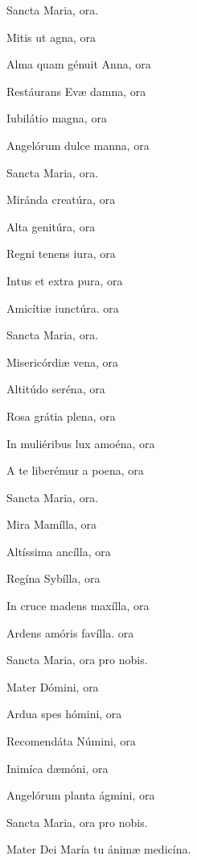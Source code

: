 \documentclass[12pt,a6paper]{book}
\begin{document}
\begin{sloppy}
Sancta Maria, ora.

\vspace{3mm}

Mitis ut agna, ora

Alma quam génuit Anna, ora

Restáurans Evæ damna, ora

Iubilátio magna, ora

Angelórum dulce manna, ora

Sancta Maria, ora.

\vspace{3mm}

Miránda creatúra, ora

Alta genitúra, ora

Regni tenens iura, ora

Intus et extra pura, ora

Amicítiæ iunctúra. ora

Sancta Maria, ora.

\vspace{3mm}

Misericórdiæ vena,  ora

Altitúdo seréna, ora

Rosa grátia plena, ora

In muliéribus lux amoéna, ora

A te liberémur a poena, ora

Sancta Maria, ora.

\vspace{3mm}

Mira Mamílla, ora

Altíssima ancílla, ora

Regína Sybílla, ora

In cruce madens maxílla, ora

Ardens amóris favílla. ora

Sancta Maria, ora pro nobis.

\vspace{3mm}

Mater Dómini, ora

Ardua spes hómini, ora

Recomendáta Númini, ora

Inimíca dæmóni, ora

Angelórum planta ágmini, ora

Sancta Maria, ora pro nobis.

\vspace{3mm}

Mater Dei María tu ánimæ medicína.


\end{sloppy}
\end{document}
